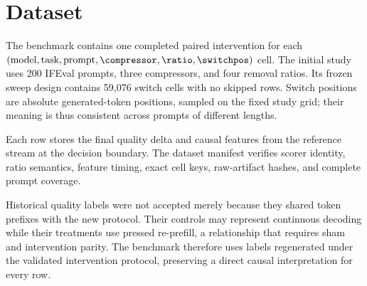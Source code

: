 \section{Dataset}

The benchmark contains one completed paired intervention for each
$(\text{model}, \text{task}, \text{prompt}, \compressor, \ratio, \switchpos)$
cell. The initial study uses 200 IFEval prompts, three compressors, and four
removal ratios. Its frozen sweep design contains 59,076 switch cells with no
skipped rows. Switch positions are absolute generated-token positions, sampled
on the fixed study grid; their meaning is thus consistent across prompts of
different lengths.

Each row stores the final quality delta and causal features from the reference
stream at the decision boundary. The dataset manifest verifies scorer identity,
ratio semantics, feature timing, exact cell keys, raw-artifact hashes, and
complete prompt coverage. 

Historical quality labels were not accepted merely because they shared token
prefixes with the new protocol. Their controls may represent continuous
decoding while their treatments use pressed re-prefill, a relationship that
requires sham and intervention parity. The benchmark therefore uses labels
regenerated under the validated intervention protocol, preserving a direct
causal interpretation for every row.
